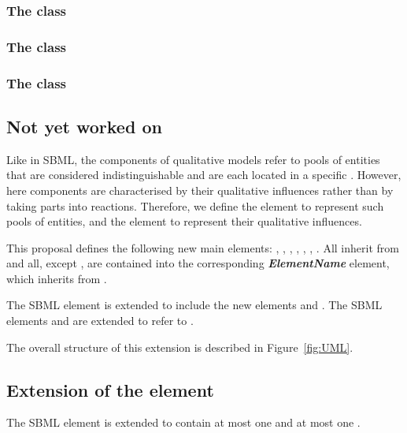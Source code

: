 \subsubsection{The  class}

\subsubsection{The  class}

\subsubsection{The  class}


\subsection{Not yet worked on}
Like  in SBML, the components of qualitative models refer to pools of entities that are considered indistinguishable and are each located in a specific . However, here components are characterised by their qualitative influences rather than by taking parts into reactions. Therefore, we define the  element to represent such pools of entities, and the  element to represent their qualitative influences.

This proposal defines the following new main elements: , , , , , , . All inherit from  and all, except , are contained into the corresponding \textbf{\emph{ElementName}} element, which inherits from .%

The SBML element  is extended to include the new elements  and . The SBML elements  and  are extended to refer to .

The overall structure of this extension is described in Figure~\ref{fig:UML}.

\bigskip
\subsection*{Extension of the  element} %
\label{sub:model}
The SBML element  is extended to contain at most one  and at most one .

